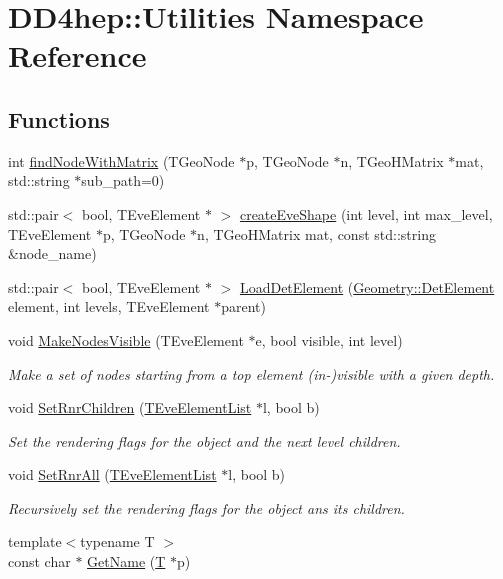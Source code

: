 \hypertarget{namespace_d_d4hep_1_1_utilities}{
\section{DD4hep::Utilities Namespace Reference}
\label{namespace_d_d4hep_1_1_utilities}
}
\subsection*{Functions}
\begin{DoxyCompactItemize}
\item 
int \hyperlink{namespace_d_d4hep_1_1_utilities_a61171c4258ed951d93ba11763da066fc}{findNodeWithMatrix} (TGeoNode $\ast$p, TGeoNode $\ast$n, TGeoHMatrix $\ast$mat, std::string $\ast$sub\_\-path=0)
\item 
std::pair$<$ bool, TEveElement $\ast$ $>$ \hyperlink{namespace_d_d4hep_1_1_utilities_aa469540c9b22f32d6ac947c4fbe7a7dc}{createEveShape} (int level, int max\_\-level, TEveElement $\ast$p, TGeoNode $\ast$n, TGeoHMatrix mat, const std::string \&node\_\-name)
\item 
std::pair$<$ bool, TEveElement $\ast$ $>$ \hyperlink{namespace_d_d4hep_1_1_utilities_a8f334a7b469c25f5315745d8dceb0fa7}{LoadDetElement} (\hyperlink{class_d_d4hep_1_1_geometry_1_1_det_element}{Geometry::DetElement} element, int levels, TEveElement $\ast$parent)
\item 
void \hyperlink{namespace_d_d4hep_1_1_utilities_a93a4f08ad1e94bdda79153a858ab809b}{MakeNodesVisible} (TEveElement $\ast$e, bool visible, int level)
\begin{DoxyCompactList}\small\item\em Make a set of nodes starting from a top element (in-\/)visible with a given depth. \item\end{DoxyCompactList}\item 
void \hyperlink{namespace_d_d4hep_1_1_utilities_a39b86ff9be41d39a9569a9a45c9484c2}{SetRnrChildren} (\hyperlink{class_t_eve_element_list}{TEveElementList} $\ast$l, bool b)
\begin{DoxyCompactList}\small\item\em Set the rendering flags for the object and the next level children. \item\end{DoxyCompactList}\item 
void \hyperlink{namespace_d_d4hep_1_1_utilities_a92896bc98df5b92fe16f7cfc74716442}{SetRnrAll} (\hyperlink{class_t_eve_element_list}{TEveElementList} $\ast$l, bool b)
\begin{DoxyCompactList}\small\item\em Recursively set the rendering flags for the object ans its children. \item\end{DoxyCompactList}\item 
{\footnotesize template$<$typename T $>$ }\\const char $\ast$ \hyperlink{namespace_d_d4hep_1_1_utilities_a966a7057d7655c50273dc41d229ae315}{GetName} (\hyperlink{class_t}{T} $\ast$p)
\end{DoxyCompactItemize}


